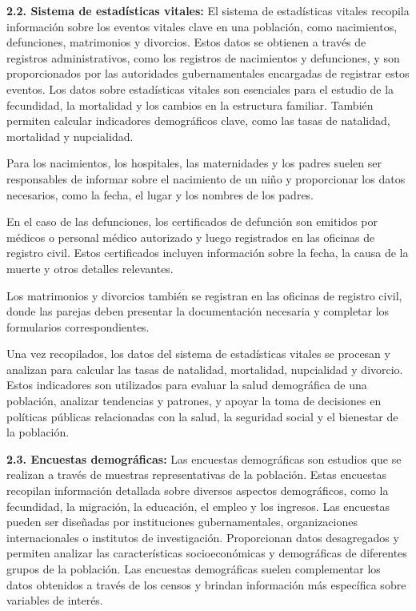 \documentclass[8pt,a4paper]{beamer}
\begin{document}
{\begin{frame}{}
\begin{block}{\textbf{2.2. Sistema de estadísticas vitales:}}
\justifying
El sistema de estadísticas vitales recopila información sobre los eventos vitales clave en una población, como nacimientos, defunciones, matrimonios y divorcios. Estos datos se obtienen a través de registros administrativos, como los registros de nacimientos y defunciones, y son proporcionados por las autoridades gubernamentales encargadas de registrar estos eventos. Los datos sobre estadísticas vitales son esenciales para el estudio de la fecundidad, la mortalidad y los cambios en la estructura familiar. También permiten calcular indicadores demográficos clave, como las tasas de natalidad, mortalidad y nupcialidad.
\end{block}
\end{frame}

\begin{frame}{}
\begin{block}{}
\justifying
Para los nacimientos, los hospitales, las maternidades y los padres suelen ser responsables de informar sobre el nacimiento de un niño y proporcionar los datos necesarios, como la fecha, el lugar y los nombres de los padres.

En el caso de las defunciones, los certificados de defunción son emitidos por médicos o personal médico autorizado y luego registrados en las oficinas de registro civil. Estos certificados incluyen información sobre la fecha, la causa de la muerte y otros detalles relevantes.

Los matrimonios y divorcios también se registran en las oficinas de registro civil, donde las parejas deben presentar la documentación necesaria y completar los formularios correspondientes.

Una vez recopilados, los datos del sistema de estadísticas vitales se procesan y analizan para calcular las tasas de natalidad, mortalidad, nupcialidad y divorcio. Estos indicadores son utilizados para evaluar la salud demográfica de una población, analizar tendencias y patrones, y apoyar la toma de decisiones en políticas públicas relacionadas con la salud, la seguridad social y el bienestar de la población.
\end{block}
\end{frame}

\begin{frame}{}
\begin{block}{\textbf{2.3. Encuestas demográficas:}}
\justifying
Las encuestas demográficas son estudios que se realizan a través de muestras representativas de la población. Estas encuestas recopilan información detallada sobre diversos aspectos demográficos, como la fecundidad, la migración, la educación, el empleo y los ingresos. Las encuestas pueden ser diseñadas por instituciones gubernamentales, organizaciones internacionales o institutos de investigación. Proporcionan datos desagregados y permiten analizar las características socioeconómicas y demográficas de diferentes grupos de la población. Las encuestas demográficas suelen complementar los datos obtenidos a través de los censos y brindan información más específica sobre variables de interés.


\end{block}
\end{frame}}
\end{document}
